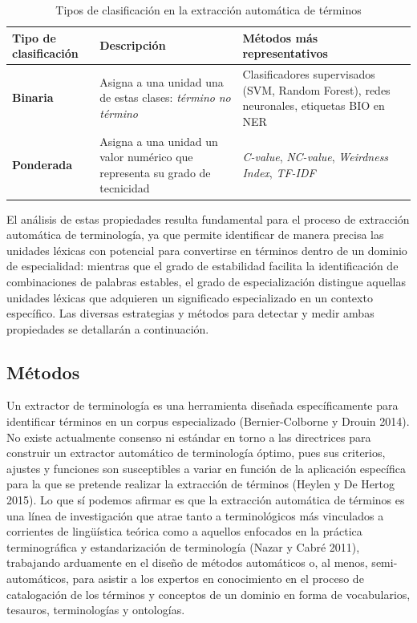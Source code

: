 \begin{enumerate}[label=(\arabic*)]
\begin{table}[H]
\small
\centering
\renewcommand{\arraystretch}{1.4}
\begin{tabular}{>{\centering\arraybackslash}m{3cm} m{3.5cm} m{5.5cm}}
\hline
\textbf{Tipo de clasificación} & \textbf{Descripción} & \textbf{Métodos más representativos} \\
\hline
\textbf{Binaria} & Asigna a una unidad una de estas clases: \emph{término} \textbar{} \emph{no término} & Clasificadores supervisados (SVM, Random Forest), redes neuronales, etiquetas BIO en NER \\
\textbf{Ponderada} & Asigna a una unidad un valor numérico que representa su grado de tecnicidad & \emph{C-value}, \emph{NC-value}, \emph{Weirdness Index}, \emph{TF-IDF} \\
\hline
\end{tabular}
\caption{Tipos de clasificación en la extracción automática de términos}
\label{tab:tipos-clasificacion}
\end{table}


El análisis de estas propiedades resulta fundamental para el proceso de extracción automática de terminología, ya que permite identificar de manera precisa las unidades léxicas con potencial para convertirse en términos dentro de un dominio de especialidad: mientras que el grado de estabilidad facilita la identificación de combinaciones de palabras estables, el grado de especialización distingue aquellas unidades léxicas que adquieren un significado especializado en un contexto específico. Las diversas estrategias y métodos para detectar y medir ambas propiedades se detallarán a continuación.

\end{enumerate}

\subsection{Métodos} \label{subsec:ate_metodos}

Un extractor de terminología es una herramienta diseñada específicamente para identificar términos en un corpus especializado (Bernier-Colborne y Drouin 2014). No existe actualmente consenso ni estándar en torno a las directrices para construir un extractor automático de terminología óptimo, pues sus criterios, ajustes y funciones son susceptibles a variar en función de la aplicación específica para la que se pretende realizar la extracción de términos (Heylen y De Hertog 2015). Lo que sí podemos afirmar es que la extracción automática de términos es una línea de investigación que atrae tanto a terminológicos más vinculados a corrientes de lingüística teórica como a aquellos enfocados en la práctica terminográfica y estandarización de terminología (Nazar y Cabré 2011), trabajando arduamente en el diseño de métodos automáticos o, al menos, semi-automáticos, para asistir a los expertos en conocimiento en el proceso de catalogación de los términos y conceptos de un dominio en forma de vocabularios, tesauros, terminologías y ontologías.

